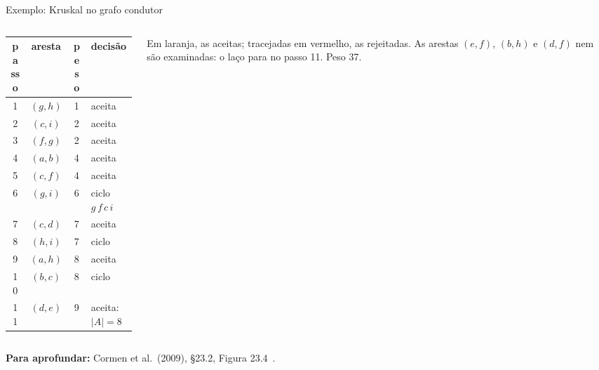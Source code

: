 \documentclass[aspectratio=169,xcolor=table]{beamer}
\newcommand{\arestasclrs}{a/b/4, a/h/8, b/c/8, b/h/11, c/d/7, c/f/4, c/i/2,
  d/e/9, d/f/14, e/f/10, f/g/2, g/h/1, g/i/6, h/i/7}
\newcommand{\grafoclrs}[3]{%
  \coordinate (a) at (0,0);     \coordinate (b) at (1,1);
  \coordinate (c) at (2.3,1);   \coordinate (d) at (3.6,1);
  \coordinate (e) at (4.6,0);   \coordinate (f) at (3.6,-1);
  \coordinate (g) at (2.3,-1);  \coordinate (h) at (1,-1);
  \coordinate (i) at (1.75,0);
  \foreach \u/\v/\w in \arestasclrs \draw[aresta] (\u) -- (\v);
  \def\lista{#1}\ifx\lista\empty\else
    \foreach \u/\v in {#1} \draw[arvore] (\u) -- (\v);\fi
  \def\lista{#3}\ifx\lista\empty\else
    \foreach \u/\v in {#3} \draw[rejeitada] (\u) -- (\v);\fi
  \foreach \u/\v/\w in \arestasclrs \path (\u) -- (\v) node[peso, pos=0.5] {\w};
  \foreach \v in {a,...,i} \node[vert] at (\v) {\v};
  \def\lista{#2}\ifx\lista\empty\else
    \foreach \v in {#2} \node[vdentro] at (\v) {\v};\fi
}
\newcommand{\fonte}[1]{%
  \vfill
  {\tiny\color{gray!55!black}\textbf{Para aprofundar:} #1\par}%
}
\begin{document}
\begin{frame}{Exemplo: Kruskal no grafo condutor}
  \begin{columns}[c]
    \begin{column}{0.4\textwidth}
      \centering\tiny
      \setlength{\tabcolsep}{3pt}
      \begin{tabular}{cccl}
        \toprule
        passo & aresta & peso & decisão \\
        \midrule
        1 & $(g,h)$ & 1 & aceita \\
        2 & $(c,i)$ & 2 & aceita \\
        3 & $(f,g)$ & 2 & aceita \\
        4 & $(a,b)$ & 4 & aceita \\
        5 & $(c,f)$ & 4 & aceita \\
        6 & $(g,i)$ & 6 & \textcolor{red!70!black}{ciclo $g\,f\,c\,i$} \\
        7 & $(c,d)$ & 7 & aceita \\
        8 & $(h,i)$ & 7 & \textcolor{red!70!black}{ciclo} \\
        9 & $(a,h)$ & 8 & aceita \\
        10 & $(b,c)$ & 8 & \textcolor{red!70!black}{ciclo} \\
        11 & $(d,e)$ & 9 & aceita: $|A| = 8$ \\
        \bottomrule
      \end{tabular}
    \end{column}
    \begin{column}{0.56\textwidth}
      \begin{center}
      \end{center}
      \scriptsize Em laranja, as aceitas; tracejadas em vermelho, as rejeitadas. As arestas
      $(e,f)$, $(b,h)$ e $(d,f)$ nem são examinadas: o laço para no passo 11. Peso 37.
    \end{column}
  \end{columns}
  \fonte{Cormen et al.\ (2009), \S 23.2, Figura 23.4~\cite{cormen2009introduction}.}
\end{frame}
\end{document}
